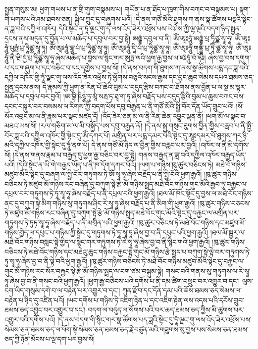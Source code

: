 སྤྱན་གསུམ་མ། ཕྱག་གཡས་པ་ན་གྲི་གུག་བསྣམས་པ། གཡོན་པ་ན་ཐོད་པ་ཁྲག་གིས་བཀང་བ་བསྣམས་པ། སྟག་གི་པགས་པའི་ཤམ་ཐབས་ཅན། སྐྱིལ་ཀྲུང་དུ་བཞུགས་པའོ། །དེ་ནས་གཙོ་མོའི་ཐུགས་ཀ་ནས་སྣ་ཚོགས་པདྨའི་སྟེང་ན་ཟླ་བའི་དཀྱིལ་འཁོར། དེའི་སྟེང་ན་ཏཱཾ་ལྗང་གུ་དེ་ལས་འོད་ཟེར་འཕྲོས་པས་ཡེ་ཤེས་ཀྱི་ལྷ་ལྔའི་བདག་ཉིད་སྤྱན་དྲངས་ནས་མདུན་དུ་བྱོན་པ་ལ་མཆོད་པ་དབུལ་བར་བྱ་སྟེ། ཨརྒྷཾ་དབུལ་བ་ནི། ཨོཾ་ཨཱཿཧཱུཾ་ཨརྒྷཾ་པྲ་ཏཱིཙྪ་སྭཱ་ཧཱ། ཨོཾ་ཨཱཿཧཱུཾ་པུཥྤཾ་པྲ་ཏཱིཙྪ་སྭཱ་ཧཱ། ཨོཾ་ཨཱཿཧཱུཾ་དྷཱུ་པཾ་པྲ་ཏཱིཙྪ་སྭཱ་ཧཱ། ཨོཾ་ཨཱཿཧཱུཾ་དཱི་པཾ་པྲ་ཏཱིཙྪ་སྭཱ་ཧཱ། ཨོཾ་ཨཱཿཧཱུཾ་གནྡྷཾ་པྲ་ཏཱི་ཙྪ་སྭཱ་ཧཱ། ཨོཾ་ཨཱཿཧཱུཾ་ནཻ་ཝི་དྱཾ་པྲ་ཏཱིཙྪ་སྭཱ་ཧཱ་ཞེས་མཆོད་པ་བྱས་ལ་སྙིང་གར་ཨུཏྤ་ལའི་ཕྱག་རྒྱ་བྱས་ལ་ཛཿཧཱུཾ་བཾ་ཧོཿ། ཞེས་བྱ་བས་དགུག་པ་དང་གཞུག་པ་དང་བཅིང་བ་དང་དགྱེས་པ་བྱས་སོ། །དེ་ནས་བདག་གི་ཐུགས་ཀ་ནས་སྣ་ཚོགས་པདྨ་དང་ཟླ་བའི་དཀྱིལ་འཁོར་གྱི་ཏཱཾ་ལྗང་གུ་ལས་འོད་ཟེར་འཕྲོས་ཏེ་ཕྱོགས་བཅུའི་སངས་རྒྱས་དང་བྱང་ཆུབ་སེམས་དཔའ་ཐམས་ཅད་སྤྱན་དྲངས་ནས། དེ་རྣམས་ཀྱི་ཕྱག་ན་རིན་པོ་ཆེའི་བུམ་པ་བདུད་རྩིས་བཀང་བ་ཐོགས་ནས་བྱོན་པ་ལ་སྔ་མ་ལྟར་མཆོད་པ་དབུལ་བར་བྱའོ། །ཨ་བྷི་ཥིཉྩ་ཏུ་མཱཾ་སརྦ་ཏ་ཐཱ་ག་ཏཱ་ཞེས་བརྗོད་པས་བདུད་རྩིའི་བུམ་པ་ཆུས་བཀང་བས་དབང་བསྐུར་བར་བསམས་ལ་རིགས་ཀྱི་བདག་པོས་དབུ་བརྒྱན་པ་ནི་གཙོ་མོའི་སྤྱི་བོར་དོན་ཡོད་གྲུབ་པའོ། །སོ་སོར་འབྲང་མ་ལ་ནི་རྣམ་པར་སྣང་མཛད་དོ། །འོད་ཟེར་ཅན་མ་ལ་ནི་རིན་ཆེན་འབྱུང་ལྡན་ནོ། །ཕག་མོ་ལ་སྣང་བ་མཐའ་ཡས་སོ། །རལ་གཅིག་མ་ལ་མི་བསྐྱོད་པས་དབུ་བརྒྱན་ནོ། །དེ་ནས་སྐུ་གསུང་ཐུགས་བྱིན་གྱིས་བརླབ་པ་ནི་སྤྱི་བོར་ཟླ་བའི་དཀྱིལ་འཁོར་གྱི་སྟེང་དུ་ཨོཾ་དཀར་པོ། མགྲིན་པར་པདྨ་དམར་པོའི་སྟེང་དུ་ཨཱཿདམར་པོ་ཐུགས་ཀར་ཉི་མའི་དཀྱིལ་འཁོར་གྱི་སྟེང་དུ་ཧཱུཾ་ནག་པོ། དེ་ནས་གཙོ་མོ་ཉིད་ལ་བྱིན་གྱིས་བརླབ་པར་བྱའོ། །འཁོར་ལ་ནི་མི་དགོས་སོ། །དེ་ནས་གནས་རྣམ་པ་བརྒྱད་དུ་ཕྱག་རྒྱ་བཅིང་བར་བྱ་སྟེ། གནས་བརྒྱད་ན་ཟླ་བའི་དཀྱིལ་འཁོར་བརྒྱད་ཡོད་པའོ། །དེའི་སྟེང་ན་ཡི་གེ་བརྒྱད་ཡོད་པ་ནི་ཁ་དོག་དཀར་པོའོ། །ལག་པ་གཉིས་ཁུ་ཚུར་བཅིངས་ཏེ། མཐེ་བོ་གཉིས་མཛུབ་མོའི་སྟེང་དུ་བཞག་ལ་སྤྱི་བོར་གཏུགས་ཏེ་ཨོཾ་སྭཱ་ཧཱ་ཞེས་བརྗོད་པ་ནི་སྤྱི་བོའི་ཕྱག་རྒྱའོ། །ཁུ་ཚུར་གཉིས་བཅིངས་ཏེ་མཛུབ་མོ་གཉིས་རང་བཞིན་དུ་བཀུག་སྟེ་རྩེ་མོ་གཉིས་སྤྲད་མཐེ་བོང་གཉིས་གུང་མོའི་རྒྱབ་ཏུ་བརྐྱང་ལ་དཔྲལ་བར་གཏུགས་ཏེ་ཏཱ་སྭཱ་ཧཱ་ཞེས་བརྗོད་པ་ནི་དཔྲལ་བའི་ཕྱག་རྒྱའོ། །ཐལ་མོ་ཁོང་སྟོང་དུ་བྱས་ལ་མཐེ་བོང་གཉིས་ནང་དུ་བཀུག་སྟེ་མིག་གཉིས་སུ་གཏུགས་ཤིང་རེ་སྭཱ་ཧཱ་ཞེས་བརྗོད་པ་ནི་མིག་གི་ཕྱག་རྒྱའོ། །ཁུ་ཚུར་གཉིས་བཅངས་ཏེ་མཛུབ་མོ་གཉིས་རང་བཞིན་དུ་བཀུག་སྟེ་རྩེ་མོ་གཉིས་སྤྲད་མཐེ་བོང་གུང་མོའི་སྟེང་དུ་བརྐྱང་ལ་མགྲིན་པར་གཏུགས་ཏེ་ཏུཏ་སྭཱ་ཧཱ་ཞེས་བརྗོད་པ་ནི་མགྲིན་པའི་ཕྱག་རྒྱའོ། །ཁུ་ཚུར་བཅིངས་ཏེ་མཐེ་བོང་གཉིས་དང་མཛུབ་མོ་གཉིས་གྱེད་ལ་དཔུང་པ་གཉིས་ཀྱི་སྟེང་དུ་གཏུགས་ཏེ་ཏཱ་སྭཱ་ཧཱ་ཞེས་བྱ་བ་ནི་དཔུང་པའི་ཕྱག་རྒྱའོ། །ཐལ་མོ་སྦྱར་ལ་མཐེ་བོང་གཉིས་བསླང་སྟེ་གྱེད་ལ་སྙིང་གར་གཏུགས་ཏེ་རེ་སྭཱ་ཧཱ་ཞེས་བྱ་བ་ནི་སྙིང་གའི་ཕྱག་རྒྱའོ། །ཁུ་ཚུར་གཉིས་བཅིངས་ཏེ་མཐེ་བོང་གཉིས་དང་མཐེའུ་ཆུང་གཉིས་བརྐྱང་སྟེ་གུང་མོ་གཉིས་རྩེ་སྤྲད་པ་བཀུག་སྟེ་ལྟེ་བར་གཏུགས་ཏེ་ཏུ་སྭཱ་ཧཱ་ཞེས་བྱ་བ་ནི་ལྟེ་བའི་ཕྱག་རྒྱའོ། །ཁུ་ཚུར་གཉིས་བཅིངས་ཏེ་མཐེ་བོང་གཉིས་མཛུབ་མོའི་སྟེང་དུ་བརྐྱང་ལ་གུང་མོ་གཉིས་རང་སོར་བརྐྱང་སྟེ་རྩེ་མོ་གཉིས་སྤྲད་ལ་བག་ཙམ་བསྐུམ་སྟེ། གསང་བའི་གནས་སུ་གཏུགས་ལ་རེ་སྭཱ་ཧཱ་ཞེས་བྱ་བ་ནི་གསང་བའི་ཕྱག་རྒྱའོ། །ཕྱག་རྒྱ་བཅིངས་པའི་དགོས་པ་ནི་དམ་ཚིག་བསྲུང་བར་འགྱུར་བ་དང་། ལུས་ངག་ཡིད་གསུམ་དགེ་བ་ལ་བརྟེན་པར་འགྱུར་བ་དང་། ཀུན་རྫོབ་དང་དོན་དམ་པའི་ཆོས་ཐམས་ཅད་སེམས་ལ་བརྟེན་པ་ཉིད་དུ་འཛིན་པའོ། །ཡང་དགོས་པ་གཉིས་ཏེ་འཇིག་རྟེན་པ་དང་འཇིག་རྟེན་ལས་འདས་པའི་དངོས་གྲུབ་ཐམས་ཅད་འབྱུང་བར་འགྱུར་བ་དང་། བདག་ལ་བདུད་ལ་སོགས་པའི་བར་ཆད་ཐམས་ཅད་ཀྱིས་མི་ཚུགས་པར་འགྱུར་བའི་དགོས་པའོ། །དེ་ནས་བདག་གི་སྙིང་གར་སྣ་ཚོགས་པད་ཟླའི་སྟེང་དུ་ཏཱཾ་ལྗང་གུ་ལས་འོད་ཟེར་འཕྲོས་པས་སེམས་ཅན་ཐམས་ཅད་ལ་ཕོག་སྟེ་སེམས་ཅན་ཐམས་ཅད་རྗེ་བཙུན་མའི་གཟུགས་སུ་བྱས་པས་སེམས་ཅན་ཐམས་ཅད་ཀྱི་ཉོན་མོངས་པ་ལྔ་དག་པར་བྱས་སོ། 